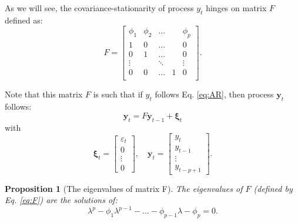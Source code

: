 \documentclass[
  12pt,
]{book}
\newtheorem{proposition}{Proposition}[chapter]
\theoremstyle{definition}
\theoremstyle{definition}
\theoremstyle{definition}
\theoremstyle{definition}
\theoremstyle{remark}
\begin{document}
As we will see, the covariance-stationarity of process \(y_t\) hinges on matrix \(F\) defined as:
\begin{equation}
F = \left[
\begin{array}{ccccc}
\phi_1 & \phi_2 & \dots& & \phi_p \\
1 & 0 &\dots && 0 \\
0 & 1 &\dots && 0 \\
\vdots &  & \ddots && \vdots \\
0 & 0 &\dots &1& 0 \\
\end{array}
\right].\label{eq:F}
\end{equation}

Note that this matrix \(F\) is such that if \(y_t\) follows Eq. \eqref{eq:AR}, then process \(\mathbf{y}_t\) follows:
\[
\mathbf{y}_t = F \mathbf{y}_{t-1} + \boldsymbol\xi_t
\]
with
\[
\boldsymbol\xi_t =
\left[\begin{array}{c}
\varepsilon_t\\
0\\
\vdots\\
0
\end{array}\right],
\quad
\mathbf{y}_t =
\left[\begin{array}{c}
y_t\\
y_{t-1}\\
\vdots\\
y_{t-p+1}
\end{array}\right].
\]

\begin{proposition}[The eigenvalues of matrix F]
\protect\hypertarget{prp:Feigen}{}\label{prp:Feigen}The eigenvalues of \(F\) (defined by Eq. \eqref{eq:F}) are the solutions of:
\begin{equation}
\lambda^p - \phi_1 \lambda^{p-1} - \dots - \phi_{p-1}\lambda - \phi_p = 0.\label{eq:Feigen}
\end{equation}
\end{proposition}
\end{document}
